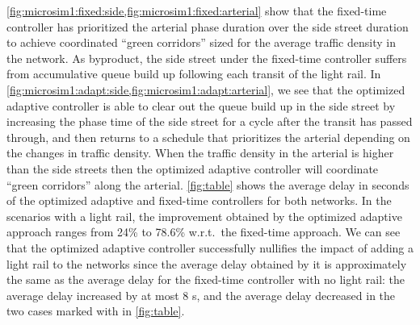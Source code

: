 \cref{fig:microsim1:fixed:side,fig:microsim1:fixed:arterial} show that the
fixed-time controller has prioritized the arterial phase duration over the
side street duration to achieve coordinated ``green corridors'' sized for the
average traffic density in the network.
%
As byproduct, the side street under the fixed-time controller suffers from
accumulative queue build up following each transit of the light rail.
%
In \cref{fig:microsim1:adapt:side,fig:microsim1:adapt:arterial}, we see that the
optimized adaptive controller is able to clear out the queue build up in the
side street by increasing the phase time of the side street for a cycle after
the transit has passed through, and then returns to a schedule that prioritizes
the arterial depending on the changes in traffic density.
%
When the traffic density in the arterial is higher than the side streets then
the optimized adaptive controller will coordinate ``green corridors'' along the
arterial.
%
\cref{fig:table} shows the average delay in seconds of the optimized
adaptive and fixed-time controllers for both networks.
%
In the scenarios with a light rail, the improvement obtained by the optimized
adaptive approach ranges from 24\% to 78.6\% w.r.t.\ the fixed-time approach.
%
We can see that the optimized adaptive controller successfully nullifies the
impact of adding a light rail to the networks since the average delay obtained
by it is approximately the same as the average delay for the fixed-time
controller with no light rail:
%
the average delay increased by at most 8 s, and the average delay decreased in
the two cases marked with \cellSymbol in \cref{fig:table}.

